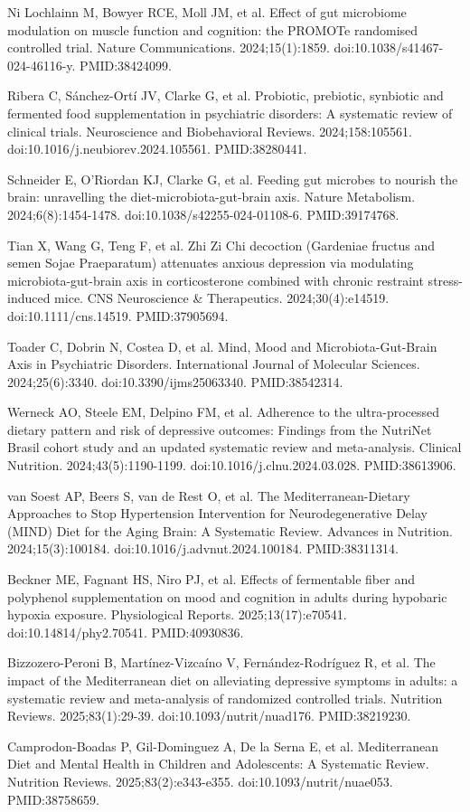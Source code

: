 \documentclass[11pt,oneside]{book}
\newcommand{\refend}{\endgroup\par}
\newcommand{\reff}[2]{\par\hangindent=7mm\hangafter=1\noindent[#1]\hspace{2mm}#2\par}
\begin{document}
\reff{31}{Ni Lochlainn M, Bowyer RCE, Moll JM, et al. Effect of gut microbiome modulation on muscle function and cognition: the PROMOTe randomised controlled trial. Nature Communications. 2024;15(1):1859. doi:10.1038/s41467-024-46116-y. PMID:38424099.}
\reff{32}{Ribera C, Sánchez-Ortí JV, Clarke G, et al. Probiotic, prebiotic, synbiotic and fermented food supplementation in psychiatric disorders: A systematic review of clinical trials. Neuroscience and Biobehavioral Reviews. 2024;158:105561. doi:10.1016/j.neubiorev.2024.105561. PMID:38280441.}
\reff{33}{Schneider E, O'Riordan KJ, Clarke G, et al. Feeding gut microbes to nourish the brain: unravelling the diet-microbiota-gut-brain axis. Nature Metabolism. 2024;6(8):1454-1478. doi:10.1038/s42255-024-01108-6. PMID:39174768.}
\reff{34}{Tian X, Wang G, Teng F, et al. Zhi Zi Chi decoction (Gardeniae fructus and semen Sojae Praeparatum) attenuates anxious depression via modulating microbiota-gut-brain axis in corticosterone combined with chronic restraint stress-induced mice. CNS Neuroscience \& Therapeutics. 2024;30(4):e14519. doi:10.1111/cns.14519. PMID:37905694.}
\reff{35}{Toader C, Dobrin N, Costea D, et al. Mind, Mood and Microbiota-Gut-Brain Axis in Psychiatric Disorders. International Journal of Molecular Sciences. 2024;25(6):3340. doi:10.3390/ijms25063340. PMID:38542314.}
\reff{36}{Werneck AO, Steele EM, Delpino FM, et al. Adherence to the ultra-processed dietary pattern and risk of depressive outcomes: Findings from the NutriNet Brasil cohort study and an updated systematic review and meta-analysis. Clinical Nutrition. 2024;43(5):1190-1199. doi:10.1016/j.clnu.2024.03.028. PMID:38613906.}
\reff{37}{van Soest AP, Beers S, van de Rest O, et al. The Mediterranean-Dietary Approaches to Stop Hypertension Intervention for Neurodegenerative Delay (MIND) Diet for the Aging Brain: A Systematic Review. Advances in Nutrition. 2024;15(3):100184. doi:10.1016/j.advnut.2024.100184. PMID:38311314.}
\reff{38}{Beckner ME, Fagnant HS, Niro PJ, et al. Effects of fermentable fiber and polyphenol supplementation on mood and cognition in adults during hypobaric hypoxia exposure. Physiological Reports. 2025;13(17):e70541. doi:10.14814/phy2.70541. PMID:40930836.}
\reff{39}{Bizzozero-Peroni B, Martínez-Vizcaíno V, Fernández-Rodríguez R, et al. The impact of the Mediterranean diet on alleviating depressive symptoms in adults: a systematic review and meta-analysis of randomized controlled trials. Nutrition Reviews. 2025;83(1):29-39. doi:10.1093/nutrit/nuad176. PMID:38219230.}
\reff{40}{Camprodon-Boadas P, Gil-Dominguez A, De la Serna E, et al. Mediterranean Diet and Mental Health in Children and Adolescents: A Systematic Review. Nutrition Reviews. 2025;83(2):e343-e355. doi:10.1093/nutrit/nuae053. PMID:38758659.}
\refend
\end{document}
